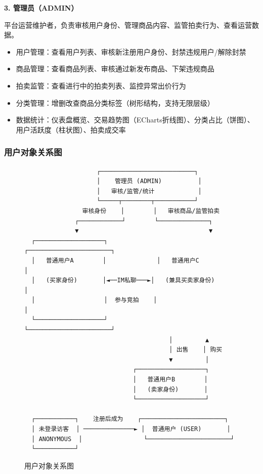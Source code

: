 \documentclass[12pt,a4paper]{ctexart}
\numberwithin{figure}{section}
\numberwithin{table}{section}
\begin{document}
\textbf{3. 管理员（ADMIN）}

平台运营维护者，负责审核用户身份、管理商品内容、监管拍卖行为、查看运营数据。

\begin{itemize}
    \item 用户管理：查看用户列表、审核新注册用户身份、封禁违规用户/解除封禁
    \item 商品管理：查看商品列表、审核通过新发布商品、下架违规商品
    \item 拍卖监管：查看进行中的拍卖列表、监控异常出价行为
    \item 分类管理：增删改查商品分类标签（树形结构，支持无限层级）
    \item 数据统计：仪表盘概览、交易趋势图（ECharts折线图）、分类占比（饼图）、用户活跃度（柱状图）、拍卖成交率
\end{itemize}

\subsubsection{用户对象关系图}

\begin{figure}[H]
\centering
{\small
\begin{verbatim}
                    ┌──────────────────────────┐
                    │    管理员 (ADMIN)          │
                    │   审核/监管/统计            │
                    └─────┬────────┬───────────┘
                审核身份    │        │   审核商品/监管拍卖
              ┌────────────┘        └──────────────┐
              ▼                                    ▼
  ┌───────────────────┐              ┌───────────────────────┐
  │   普通用户A        │              │   普通用户C             │
  │   (买家身份)       │◄──IM私聊───►│   (兼具买卖家身份)      │
  │                   │  参与竞拍    │                       │
  └───────────────────┘              └───────────────────────┘
                                        │         ▲
                                        │ 出售    │ 购买
                                        ▼         │
                              ┌───────────────────┐
                              │   普通用户B        │
                              │   (卖家身份)       │
                              └───────────────────┘

  ┌───────────┐    注册后成为    ┌───────────────────────┐
  │ 未登录访客  │ ──────────────► │  普通用户 (USER)       │
  │ ANONYMOUS  │                 └───────────────────────┘
  └───────────┘
\end{verbatim}
}
\caption{用户对象关系图}
\label{fig:user-relationship}
\end{figure}
\end{document}
